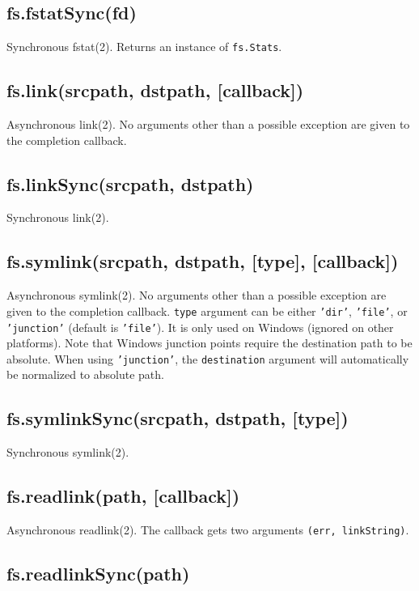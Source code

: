 \subsection{fs.fstatSync(fd)}

Synchronous fstat(2). Returns an instance of \texttt{fs.Stats}.

\subsection{fs.link(srcpath, dstpath, {[}callback{]})}

Asynchronous link(2). No arguments other than a possible exception are
given to the completion callback.

\subsection{fs.linkSync(srcpath, dstpath)}

Synchronous link(2).

\subsection{fs.symlink(srcpath, dstpath, {[}type{]}, {[}callback{]})}

Asynchronous symlink(2). No arguments other than a possible exception
are given to the completion callback. \texttt{type} argument can be
either \texttt{'dir'}, \texttt{'file'}, or \texttt{'junction'} (default
is \texttt{'file'}). It is only used on Windows (ignored on other
platforms). Note that Windows junction points require the destination
path to be absolute. When using \texttt{'junction'}, the
\texttt{destination} argument will automatically be normalized to
absolute path.

\subsection{fs.symlinkSync(srcpath, dstpath, {[}type{]})}

Synchronous symlink(2).

\subsection{fs.readlink(path, {[}callback{]})}

Asynchronous readlink(2). The callback gets two arguments
\texttt{(err, linkString)}.

\subsection{fs.readlinkSync(path)}

